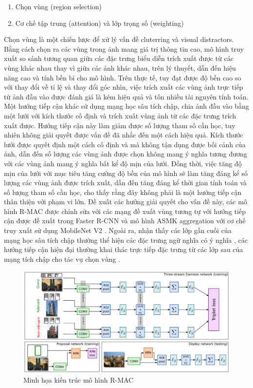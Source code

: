 \begin{enumerate}
    \item Chọn vùng (region selection)
    \item Cơ chế tập trung (attention) và lớp trọng số (weighting)
\end{enumerate}

Chọn vùng là một chiến lược để xử lý vấn đề cluterring và visual distractors. Bằng cách chọn ra các vùng trong ảnh mang giá trị thông tin cao, mô hình truy xuất so sánh tương quan giữa các đặc trưng biểu diễn trích xuất được từ các vùng khác nhau thay vì giữa các ảnh khác nhau, trên lý thuyết, dẫn đến hiệu năng cao và tính bền bỉ cho mô hình. Trên thực tế, tuy đạt được độ bền cao so với thay đổi về tỉ lệ và thay đổi góc nhìn, việc trích xuất các vùng ảnh trực tiếp từ ảnh đầu vào được đánh giá là kém hiệu quả và tốn nhiều tài nguyên tính toán. Một hướng tiếp cận khác sử dụng mạng học sâu tích chập, chia ảnh đầu vào bằng một lưới với kích thước cố định và trích xuất vùng ảnh từ các đặc trưng trích xuất được\cite{razavian2016visual, tolias2015particular}. Hướng tiếp cận này làm giảm được số lượng tham số cần học, tuy nhiên không giải quyết được vấn đề đã nhắc đến một cách hiệu quả. Kích thước lưới được quyết định một cách cố định và mà không tận dụng được bối cảnh của ảnh, dẫn đến số lượng các vùng ảnh được chọn không mang ý nghĩa tương đương với các vùng ảnh mang ý nghĩa bất kể độ mịn của lưới. Đồng thời, việc tăng độ mịn của lưới với mục tiêu tăng cường độ bền của mô hình sẽ làm tăng đáng kể số lượng các vùng ảnh được trích xuất, dẫn đến tăng đáng kể thời gian tính toán và số lượng tham số cần học, cho thấy rằng đây không phải là một hướng tiếp cận thân thiện với phạm vi lớn. Đề xuất các hướng giải quyết cho vấn đề này, các mô hình R-MAC \cite{tolias2015particular} được chỉnh sửa với các mạng đề xuất vùng tương tự với hướng tiếp cận được đề xuất trong Faster R-CNN \cite{ren2015faster} và mô hình ASMK aggregation \cite{selective-match-kernel} với cơ chế truy xuất sử dụng MobileNet V2 \cite{sandler2018mobilenetv2, teichmann2019detect}. Ngoài ra, nhận thấy các lớp gần cuối của mạng học sâu tích chập thường thể hiện các đặc trưng ngữ nghĩa có ý nghĩa \cite{ZeilerVisualizingAU}, các hướng tiếp cận hiện đại thường khai thác trực tiếp đặc trưng từ các lớp sau của mạng tích chập cho tác vụ chọn vùng \cite{chen2017only, khaliq2019holistic}.

\begin{figure}[H]
    \centering
    \includegraphics[width=\textwidth]{pics/Chapter2/rmac.png}
    \caption{Minh họa kiến trúc mô hình R-MAC \cite{tolias2015particular}}
\end{figure}

